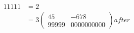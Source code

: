 \begin{align*}11111&=2 \\
&=3\begin{pmatrix}
45&-678\\
99999& 0000000000
\end{pmatrix} after  \\
\end{align*}
